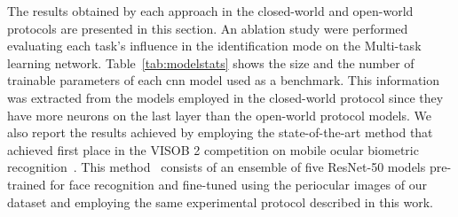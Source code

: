 The results obtained by each approach in the closed-world and open-world protocols are presented in this section.
An ablation study were performed evaluating each task's influence in the identification mode on the Multi-task learning network.
Table~\ref{tab:modelstats} shows the size and the number of trainable parameters of each \gls*{cnn} model used as a benchmark.
This information was extracted from the models employed in the closed-world protocol since they have more neurons on the last layer than the open-world protocol models.
We also report the results achieved by employing the state-of-the-art method that achieved first place in the VISOB 2 competition on mobile ocular biometric recognition~\cite{nguyen2021visob}.
This method~\cite{zanlorensi2020deep} consists of an ensemble of five ResNet-50 models pre-trained for face recognition and fine-tuned using the periocular images of our dataset and employing the same experimental protocol described in this work.

\begin{table}[!ht]
\centering
\caption{Size~(MB) and number of trainable parameters of the \gls*{cnn}~models used in the benchmark.}
\label{tab:modelstats}

\vspace{-2mm}
\end{table}

